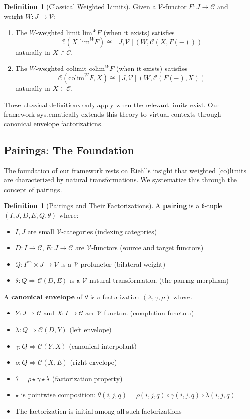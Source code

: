 \documentclass[11pt]{article}
\theoremstyle{plain}
\theoremstyle{definition}
\newtheorem{definition}[theorem]{Definition}
\theoremstyle{remark}
\newcommand{\V}{\mathcal{V}}
\newcommand{\C}{\mathcal{C}}
\newcommand{\op}{\mathrm{op}}
\newcommand{\colim}{\mathrm{colim}}
\renewcommand{\lim}{\mathrm{lim}}
\begin{document}
\begin{definition}[Classical Weighted Limits]
Given a $\V$-functor $F : J \to \C$ and weight $W : J \to \V$:
\begin{enumerate}
\item The $W$-weighted limit $\lim^W F$ (when it exists) satisfies 
\[
\C(X, \lim^W F) \cong [J, \V](W, \C(X, F(-)))
\]
naturally in $X \in \C$.

\item The $W$-weighted colimit $\colim^W F$ (when it exists) satisfies
\[
\C(\colim^W F, X) \cong [J, \V](W, \C(F(-), X))
\]
naturally in $X \in \C$.
\end{enumerate}
\end{definition}

These classical definitions only apply when the relevant limits exist. Our framework systematically extends this theory to virtual contexts through canonical envelope factorizations.

\subsection{Pairings: The Foundation}

The foundation of our framework rests on Riehl's insight \cite{riehl2008weighted,riehl2014categorical} that weighted (co)limits are characterized by natural transformations. We systematize this through the concept of pairings.

\begin{definition}[Pairings and Their Factorizations]
A \textbf{pairing} is a 6-tuple $(I, J, D, E, Q, \theta)$ where:
\begin{itemize}
\item $I, J$ are small $\V$-categories (indexing categories)
\item $D : I \to \C$, $E : J \to \C$ are $\V$-functors (source and target functors)
\item $Q : I^{\op} \times J \to \V$ is a $\V$-profunctor (bilateral weight)
\item $\theta : Q \Rightarrow \C(D, E)$ is a $\V$-natural transformation (the pairing morphism)
\end{itemize}

A \textbf{canonical envelope} of $\theta$ is a factorization $(\lambda, \gamma, \rho)$ where:
\begin{itemize}
\item $Y : J \to \C$ and $X : I \to \C$ are $\V$-functors (completion functors)
\item $\lambda : Q \Rightarrow \C(D, Y)$ (left envelope)
\item $\gamma : Q \Rightarrow \C(Y, X)$ (canonical interpolant)
\item $\rho : Q \Rightarrow \C(X, E)$ (right envelope)
\item $\theta = \rho \star \gamma \star \lambda$ (factorization property)
\item $\star$ is pointwise composition: $\theta(i,j,q) = \rho(i,j,q) \circ \gamma(i,j,q) \circ \lambda(i,j,q)$
\item The factorization is initial among all such factorizations
\end{itemize}
\end{definition}
\end{document}
